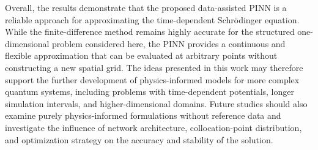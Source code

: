 \documentclass[11pt]{article}
\begin{document}
Overall, the results demonstrate that the proposed data-assisted PINN is a reliable approach for 
approximating the time-dependent Schrödinger equation. While the finite-difference method remains 
highly accurate for the structured one-dimensional problem considered here, the PINN provides a 
continuous and flexible approximation that can be evaluated at arbitrary points without constructing a 
new spatial grid. The ideas presented in this work may therefore support the further development of 
physics-informed models for more complex quantum systems, including problems with time-dependent 
potentials, longer simulation intervals, and higher-dimensional domains. Future studies should also 
examine purely physics-informed formulations without reference data and investigate the influence of 
network architecture, collocation-point distribution, and optimization strategy on the accuracy and 
stability of the solution.

\newpage
\nocite{*}


\end{document}
